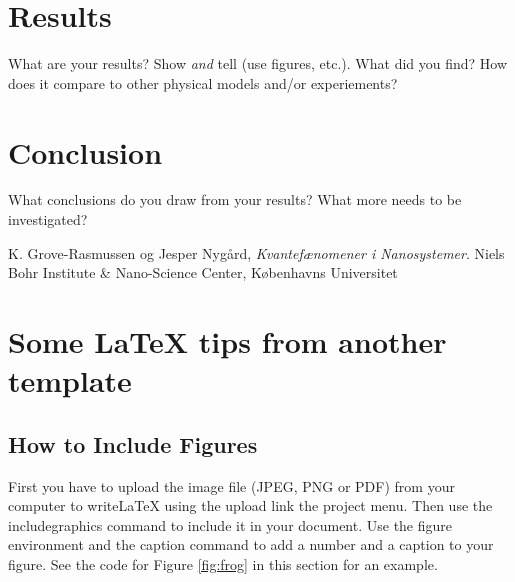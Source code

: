 \documentclass[]{article}%
\begin{document}
\section{Results}
\label{sec:results}

What are your results? Show \textit{and} tell (use figures, etc.). What did you find? How does it compare to other physical models and/or experiements? 

\section{Conclusion}
\label{sec:conclusion}

What conclusions do you draw from your results? What more needs to be investigated?

\begin{thebibliography}{9}
  K. Grove-Rasmussen og Jesper Nygård,
  \emph{Kvantefænomener i Nanosystemer}.
  Niels Bohr Institute \& Nano-Science Center, Københavns Universitet
  
\end{thebibliography}






\newpage
\appendix
\section{Some LaTeX tips from another template}
\label{sec:latex}
\subsection{How to Include Figures}

First you have to upload the image file (JPEG, PNG or PDF) from your computer to writeLaTeX using the upload link the project menu. Then use the includegraphics command to include it in your document. Use the figure environment and the caption command to add a number and a caption to your figure. See the code for Figure \ref{fig:frog} in this section for an example.
\end{document}
